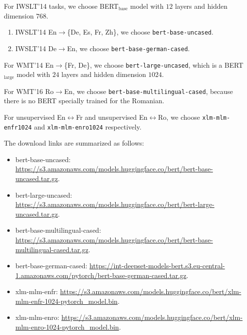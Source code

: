 \documentclass{article} \usepackage{iclr2020_conference,times}
\begin{document}
For IWSLT'14 tasks, we choose BERT$_{\text{base}}$ model with $12$ layers and hidden dimension $768$.
\begin{enumerate}
\item IWSLT’14 En$\to$\{De, Es, Fr, Zh\}, we choose \texttt{bert-base-uncased}.
\item IWSLT’14 De$\to$En, we choose \texttt{bert-base-german-cased}.
\end{enumerate}
For WMT’14 En$\to$\{Fr, De\}, we choose \texttt{bert-large-uncased}, which is a BERT$_{\text{large}}$ model with $24$ layers and hidden dimension $1024$.

For WMT’16 Ro$\to$En, we choose \texttt{bert-base-multilingual-cased}, because there is no BERT specially trained for the Romanian. 

For unsupervised En$\leftrightarrow$Fr and unsupervised En$\leftrightarrow$Ro, we choose \texttt{xlm-mlm-enfr1024} and \texttt{xlm-mlm-enro1024} respectively.

The download links are summarized as follows:
\begin{itemize}
    \item bert-base-uncased: \url{https://s3.amazonaws.com/models.huggingface.co/bert/bert-base-uncased.tar.gz}.
    \item bert-large-uncased: \url{https://s3.amazonaws.com/models.huggingface.co/bert/bert-large-uncased.tar.gz}.
    \item bert-base-multilingual-cased: \url{https://s3.amazonaws.com/models.huggingface.co/bert/bert-base-multilingual-cased.tar.gz}.
    \item bert-base-german-cased: \url{https://int-deepset-models-bert.s3.eu-central-1.amazonaws.com/pytorch/bert-base-german-cased.tar.gz}.
    \item xlm-mlm-enfr: \url{https://s3.amazonaws.com/models.huggingface.co/bert/xlm-mlm-enfr-1024-pytorch_model.bin}.
    \item xlm-mlm-enro: \url{https://s3.amazonaws.com/models.huggingface.co/bert/xlm-mlm-enro-1024-pytorch_model.bin}.
\end{itemize}
\end{document}
